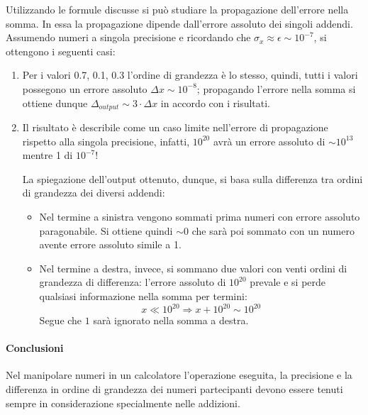 Utilizzando le formule discusse si può studiare la propagazione dell’errore nella somma.
In essa la propagazione dipende dall’errore assoluto dei singoli addendi.
Assumendo numeri a singola precisione e ricordando che $ \sigma_x \approx \epsilon \sim 10^{-7}$,
si ottengono i seguenti casi:

\begin{enumerate}

	\item Per i valori 0.7, 0.1, 0.3 l’ordine di grandezza è lo stesso, quindi,
	      tutti i valori possegono un errore assoluto $\Delta x \sim 10^{-8}$; propagando
	      l’errore nella somma si ottiene dunque $\Delta_{output} \sim 3 \cdot \Delta x$ in accordo con
	      i risultati.

	\item Il risultato è describile come un caso limite nell’errore di propagazione rispetto
	      alla singola precisione, infatti, $10^{20}$ avrà un errore assoluto di $\sim 10^{13}$
	      mentre 1 di $10^{-7}$!

	      La spiegazione dell'output ottenuto, dunque, si basa sulla differenza
	      tra ordini di grandezza dei diversi addendi:
	      \begin{itemize}
		      \item Nel termine a sinistra
		            vengono sommati prima numeri con errore assoluto paragonabile.
		            Si ottiene quindi $\sim 0$ che sarà poi sommato con un numero
		            avente errore assoluto simile a 1.

		      \item
		            Nel termine a destra, invece, si sommano due valori con venti
		            ordini di grandezza di differenza: l’errore assoluto di
		            $10^{20}$ prevale e si perde qualsiasi informazione nella somma per termini:
		            $$x \ll 10^{20} \Rightarrow x + 10^{20} \sim 10^{20}$$
		            Segue che $\mathit{1}$ sarà ignorato nella somma a destra.
	      \end{itemize}

\end{enumerate}

\paragraph{Conclusioni}
Nel manipolare numeri in un calcolatore l’operazione eseguita, la precisione e
la differenza in ordine di grandezza dei numeri partecipanti devono essere tenuti
sempre in considerazione specialmente nelle addizioni.


